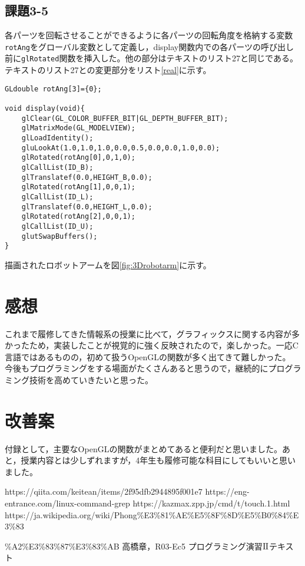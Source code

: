 \documentclass[]{jsarticle}
\begin{document}
\subsection{課題3-5}
各パーツを回転させることができるように各パーツの回転角度を格納する変数\texttt{rotAng}をグローバル変数として定義し，display関数内での各パーツの呼び出し前に\texttt{glRotated}関数を挿入した。他の部分はテキストのリスト27と同じである。テキストのリスト27との変更部分をリスト\ref{real}に示す。
\begin{lstlisting}[caption=リアルなロボットアームを描画するプログラム(変更部分),label=real]
GLdouble rotAng[3]={0};

void display(void){
	glClear(GL_COLOR_BUFFER_BIT|GL_DEPTH_BUFFER_BIT);
	glMatrixMode(GL_MODELVIEW);
	glLoadIdentity();
	gluLookAt(1.0,1.0,1.0,0.0,0.5,0.0,0.0,1.0,0.0);
	glRotated(rotAng[0],0,1,0);
	glCallList(ID_B);
	glTranslatef(0.0,HEIGHT_B,0.0);
	glRotated(rotAng[1],0,0,1);
	glCallList(ID_L);
	glTranslatef(0.0,HEIGHT_L,0.0);
	glRotated(rotAng[2],0,0,1);
	glCallList(ID_U);
	glutSwapBuffers();
}
\end{lstlisting}

描画されたロボットアームを図\ref{fig:3Drobotarm}に示す。

\section{感想}
これまで履修してきた情報系の授業に比べて，グラフィックスに関する内容が多かったため，実装したことが視覚的に強く反映されたので，楽しかった。一応C言語ではあるものの，初めて扱うOpenGLの関数が多く出てきて難しかった。
今後もプログラミングをする場面がたくさんあると思うので，継続的にプログラミング技術を高めていきたいと思った。

\section{改善案}
付録として，主要なOpenGLの関数がまとめてあると便利だと思いました。あと，授業内容とは少しずれますが，4年生も履修可能な科目にしてもいいと思いました。
\begin{thebibliography}{99}
 https://qiita.com/keitean/items/2f95dfb2944895f001e7
 https://eng-entrance.com/linux-command-grep
 https://kazmax.zpp.jp/cmd/t/touch.1.html
 https://ja.wikipedia.org/wiki/Phong\%E3\%81\%AE\%E5\%8F\%8D\%E5\%B0\%84\%E3\%83

\%A2\%E3\%83\%87\%E3\%83\%AB
 高橋章，R03-Ec5 プログラミング演習$\rm I\hspace{-.01em}I$テキスト
\end{thebibliography}
\end{document}
